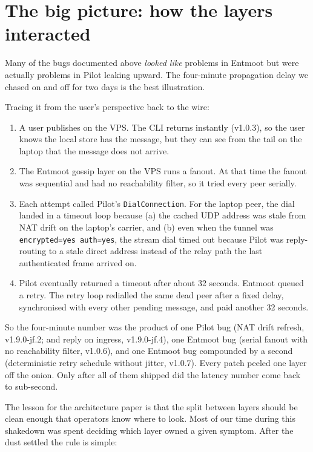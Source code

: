 \documentclass[11pt,a4paper]{article}
\begin{document}
\section{The big picture: how the layers interacted}
\label{sec:bigpicture}

Many of the bugs documented above \emph{looked like} problems
in Entmoot but were actually problems in Pilot leaking upward.
The four-minute propagation delay we chased on and off for two
days is the best illustration.

Tracing it from the user's perspective back to the wire:

\begin{enumerate}[leftmargin=1.5em]
    \item A user publishes on the VPS. The CLI returns
    instantly (v1.0.3), so the user knows the local store has
    the message, but they can see from the tail on the laptop
    that the message does not arrive.
    \item The Entmoot gossip layer on the VPS runs a fanout. At
    that time the fanout was sequential and had no reachability
    filter, so it tried every peer serially.
    \item Each attempt called Pilot's \texttt{DialConnection}.
    For the laptop peer, the dial landed in a timeout loop
    because (a) the cached UDP address was stale from NAT drift
    on the laptop's carrier, and (b) even when the tunnel was
    \texttt{encrypted=yes auth=yes}, the stream dial timed out
    because Pilot was reply-routing to a stale direct address
    instead of the relay path the last authenticated frame
    arrived on.
    \item Pilot eventually returned a timeout after about 32
    seconds. Entmoot queued a retry. The retry loop redialled
    the same dead peer after a fixed delay, synchronised with
    every other pending message, and paid another 32 seconds.
\end{enumerate}

So the four-minute number was the product of one Pilot bug
(NAT drift refresh, v1.9.0-jf.2; and reply on ingress,
v1.9.0-jf.4), one Entmoot bug (serial fanout with no
reachability filter, v1.0.6), and one Entmoot bug compounded by
a second (deterministic retry schedule without jitter, v1.0.7).
Every patch peeled one layer off the onion. Only after all of
them shipped did the latency number come back to sub-second.

The lesson for the architecture paper is that the split between
layers should be clean enough that operators know where to
look. Most of our time during this shakedown was spent deciding
which layer owned a given symptom. After the dust settled the
rule is simple:
\end{document}
